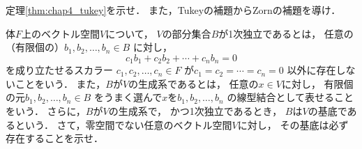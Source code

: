   \begin{que} \label{que:chap4_tukey}
    定理\ref{thm:chap4_tukey}を示せ．
    また，Tukeyの補題からZornの補題を導け．
  \end{que}

  \begin{que} \label{que:senkeikitei}
    体$F$上のベクトル空間$V$について，
    $V$の部分集合$B$が1次独立であるとは，
    任意の（有限個の）$b_1, b_2, \ldots , b_n \in B$
    に対し，
    \[
      c_1 b_1 + c_2 b_2 + \cdots + c_n b_n = 0
    \]
    を成り立たせるスカラー
    $c_1, c_2, \ldots, c_n \in F$
    が$c_1 = c_2 = \cdots = c_n =0$
    以外に存在しないことをいう．
    また，$B$が$V$の生成系であるとは，
    任意の$x \in V$に対し，
    有限個の元$b_1 , b_2, \ldots, b_n \in B$
    をうまく選んで$x$を$b_1, b_2, \ldots , b_n$
    の線型結合として表せることをいう．
    さらに，$B$が$V$の生成系で，
    かつ1次独立であるとき，
    $B$は$V$の基底であるという．
    さて，零空間でない任意のベクトル空間$V$に対し，
    その基底は必ず存在することを示せ．
  \end{que}



     

 


  





     
     
     

